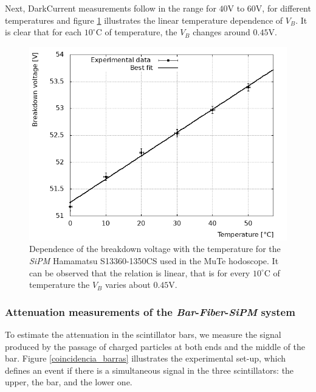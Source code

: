 \documentclass[submitting]{nst}
\begin{document}
Next, DarkCurrent \cite{Renker2006} measurements follow in the range for $40$V to $60$V, for different temperatures and figure \ref{temperature} illustrates the linear temperature dependence of  $V_B$. It is clear that  for each $10^{\circ}$C of temperature, the $V_B$ changes around $0.45$V.
\begin{figure}[h!] %
    \centering
        \includegraphics[scale=0.49]{Figures/voltajeRuptura.png}
   \caption{Dependence of the breakdown voltage with the temperature for the \textsl{SiPM} Hamamatsu S13360-1350CS used in the MuTe hodoscope. It can be observed that the relation is linear, that is for every $10^{\circ}$C of temperature the $V_B$ varies about $0.45$V.}\label{temperature}
\end{figure}

\subsubsection{Attenuation measurements of the \textsl{Bar}-\textsl{Fiber}-\textsl{SiPM} system}\label{attenuation-experimental}%
To estimate the attenuation in the scintillator bars, we measure the signal produced by the passage of charged particles at both ends and the middle of the bar. Figure \ref{coincidencia_barras} illustrates the experimental set-up, which defines an event if there is a simultaneous signal in the three scintillators: the upper, the bar, and the lower one. 
\end{document}
